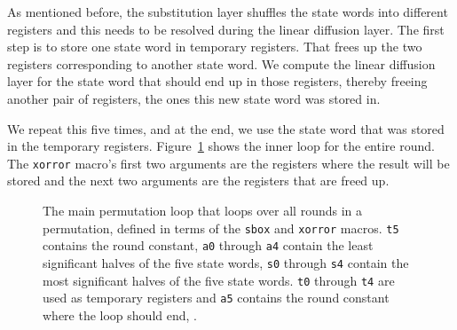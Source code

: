 As mentioned before, the substitution layer shuffles the state words into
different registers and this needs to be resolved during the linear diffusion
layer. The first step is to store one state word in temporary registers. That
frees up the two registers corresponding to another state word. We compute the
linear diffusion layer for the state word that should end up in those registers,
thereby freeing another pair of registers, the ones this new state word was
stored in.

We repeat this five times, and at the end, we use the state word that was stored
in the temporary registers. Figure~\ref{round} shows the inner loop for the
entire round. The \texttt{xorror} macro's first two arguments are the registers
where the result will be stored and the next two arguments are the registers
that are freed up.

\begin{figure}[p]


\caption{The main permutation loop that loops over all rounds in a permutation,
defined in terms of the \texttt{sbox} and \texttt{xorror} macros.
\texttt{t5} contains the round constant, \texttt{a0} through \texttt{a4}
contain the least significant halves of the five state words, \texttt{s0}
through \texttt{s4} contain the most significant halves of the five state words.
\texttt{t0} through \texttt{t4} are used as temporary registers and \texttt{a5}
contains the round constant where the loop should end, .}

\label{round}
\end{figure}
